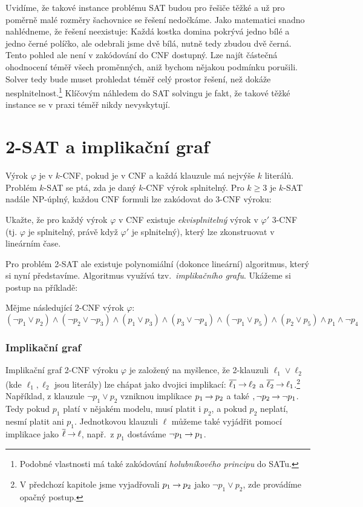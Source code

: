 Uvidíme, že takové instance problému SAT budou pro řešiče těžké a už pro poměrně malé rozměry šachovnice se řešení nedočkáme. Jako matematici snadno nahlédneme, že řešení neexistuje: Každá kostka domina pokrývá jedno bílé a jedno černé políčko, ale odebrali jsme dvě bílá, nutně tedy zbudou dvě černá. Tento pohled ale není v zakódování do CNF dostupný. Lze najít částečná ohodnocení téměř všech proměnných, aniž bychom nějakou podmínku porušili. Solver tedy bude muset prohledat téměř celý prostor řešení, než dokáže nesplnitelnost.\footnote{Podobné vlastnosti má také zakódování \emph{holubníkového principu} do SATu.} Klíčovým náhledem do SAT solvingu je fakt, že takové těžké instance se v praxi téměř nikdy nevyskytují.

\section{2-SAT a implikační graf}

Výrok $\varphi$ je v $k$-CNF, pokud je v CNF a každá klauzule má nejvýše $k$ literálů. Problém $k$-SAT se ptá, zda je daný $k$-CNF výrok splnitelný. Pro $k\geq 3$ je $k$-SAT nadále NP-úplný, každou CNF formuli lze zakódovat do 3-CNF výroku:

\begin{exercise}
Ukažte, že pro každý výrok $\varphi$ v CNF existuje \emph{ekvisplnitelný} výrok v $\varphi'$ 3-CNF (tj. $\varphi$ je splnitelný, právě když $\varphi'$ je splnitelný), který lze zkonstruovat v lineárním čase.
\end{exercise}

Pro problém 2-SAT ale existuje polynomiální (dokonce lineární) algoritmus, který si nyní představíme. Algoritmus využívá tzv.\ \emph{implikačního grafu}. Ukážeme si postup na příkladě:
\begin{example}
    Mějme následující 2-CNF výrok $\varphi$:
    $$
    (\neg p_1 \lor p_2) \land (\neg p_2 \lor \neg p_3) \land (p_1\lor p_3) \land (p_3\lor \neg p_4)\land (\neg p_1\lor p_5)\land (p_2\lor p_5)\land p_1\land \neg p_4
    $$
\end{example}

\subsubsection{Implikační graf}

Implikační graf 2-CNF výroku $\varphi$ je založený na myšlence, že 2-klauzuli $\ell_1\lor \ell_2$ (kde $\ell_1,\ell_2$ jsou literály) lze chápat jako dvojici implikací: $\overline{\ell_1}\mathbin{\rightarrow}\ell_2$ a $\overline{\ell_2}\mathbin{\rightarrow} \ell_1$.\footnote{V předchozí kapitole jsme vyjadřovali $p_1\mathbin{\rightarrow} p_2$ jako $\neg p_1\lor p_2$, zde provádíme opačný postup.} Například, z klauzule $\neg p_1\lor p_2$ vzniknou implikace $p_1\mathbin{\rightarrow} p_2$ a také $,\neg p_2\mathbin{\rightarrow} \neg p_1$. Tedy pokud $p_1$ platí v nějakém modelu, musí platit i $p_2$, a pokud $p_2$ neplatí, nesmí platit ani $p_1$. Jednotkovou klauzuli $\ell$ můžeme také vyjádřit pomocí implikace jako $\overline{\ell}\mathbin{\rightarrow}\ell$, např.\ z $p_1$ dostáváme $\neg p_1\mathbin{\rightarrow} p_1$.

